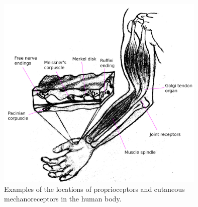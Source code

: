 \begin{figure}[H]
    \centering
    \includegraphics[width=10cm]{Figures/propriocetors_n_cutaneous_mechanoreceptors_labelled.png}
    \caption{Examples of the locations of proprioceptors and cutaneous mechanoreceptors in the human body.}
    \label{fig:proprioceptors-mechanoreceptors}
\end{figure}


